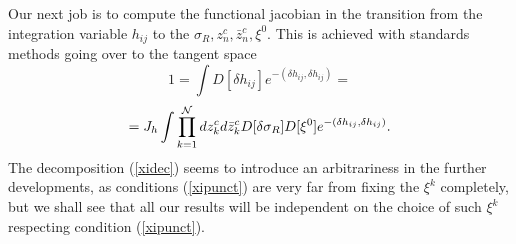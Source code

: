 \documentclass[a4paper,12pt]{article}
\begin{document}
Our next job is to compute the functional jacobian in the transition
from the integration variable $h_{ij}$ to the $\sigma_R, z^c_n,\bar
z^c_n, 
\xi^0$. This is achieved with standards methods going over to the
tangent space \cite{alvarez}
$$
1=\int D[\delta h_{ij}]e^{-(\delta h_{ij}, \delta h_{ij} )}=
$$
\begin{equation}
=J_h \int \prod_{k=1}^{\cal N} dz^c_k d \bar z^c_k  D[\delta
\sigma_R]D[\xi^0] 
e^{-( \delta h_{ij}, \delta h_{ij} ) }.
\end{equation}
The decomposition (\ref{xidec}) seems to introduce an
arbitrariness in the further developments, as conditions (\ref{xipunct}) 
are very far from fixing the $\xi^{k}$ completely, but we shall
see that all our results will be independent on the
choice of such $\xi^{k}$ respecting condition (\ref{xipunct}).
\end{document}
